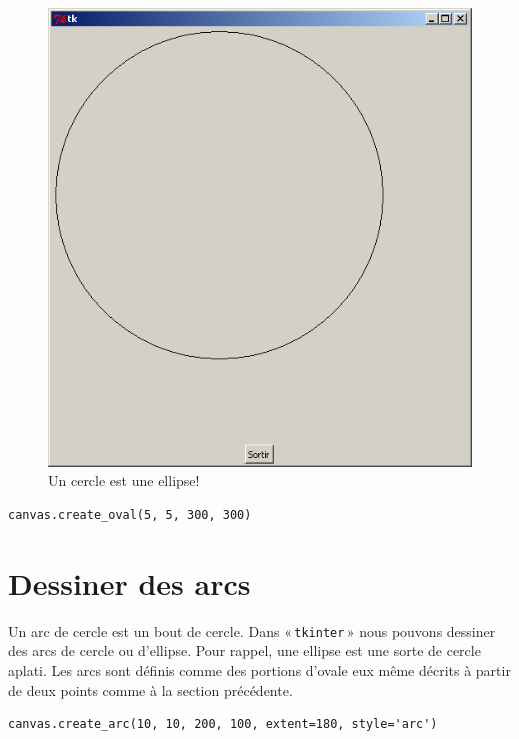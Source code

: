 \begin{figure}[h!]
\centering
\includegraphics[scale=0.4]{images/cerclebis}
\caption{Un cercle est une ellipse!}\label{fig:cerclebis}
\end{figure}

\begin{Verbatim}[frame=single,rulecolor=\color{mbleu}, label=à taper]
canvas.create_oval(5, 5, 300, 300)
\end{Verbatim}

\section{Dessiner des arcs}
Un arc de cercle est un bout de cercle. Dans « \texttt{tkinter} » nous pouvons dessiner des arcs de cercle ou d'ellipse. Pour rappel, une ellipse est une sorte de cercle aplati. 
Les arcs sont définis comme des portions d'ovale eux même décrits à partir de deux points comme à la section précédente.

\begin{Verbatim}[frame=single,rulecolor=\color{mbleu}, label=à taper]
canvas.create_arc(10, 10, 200, 100, extent=180, style='arc')
\end{Verbatim}



